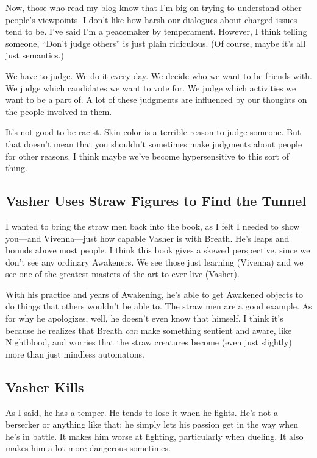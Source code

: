 Now, those who read my blog know that I’m big on trying to understand other people’s viewpoints. I don’t like how harsh our dialogues about charged issues tend to be. I’ve said I’m a peacemaker by temperament. However, I think telling someone, “Don’t judge others” is just plain ridiculous. (Of course, maybe it’s all just semantics.)

We have to judge. We do it every day. We decide who we want to be friends with. We judge which candidates we want to vote for. We judge which activities we want to be a part of. A lot of these judgments are influenced by our thoughts on the people involved in them.

It’s not good to be racist. Skin color is a terrible reason to judge someone. But that doesn’t mean that you shouldn’t sometimes make judgments about people for other reasons. I think maybe we’ve become hypersensitive to this sort of thing.

\subsection*{Vasher Uses Straw Figures to Find the Tunnel}

I wanted to bring the straw men back into the book, as I felt I needed to show you—and Vivenna—just how capable Vasher is with Breath. He’s leaps and bounds above most people. I think this book gives a skewed perspective, since we don’t see any ordinary Awakeners. We see those just learning (Vivenna) and we see one of the greatest masters of the art to ever live (Vasher).

With his practice and years of Awakening, he’s able to get Awakened objects to do things that others wouldn’t be able to. The straw men are a good example. As for why he apologizes, well, he doesn’t even know that himself. I think it’s because he realizes that Breath \textit{can} make something sentient and aware, like Nightblood, and worries that the straw creatures become (even just slightly) more than just mindless automatons.

\subsection*{Vasher Kills}

As I said, he has a temper. He tends to lose it when he fights. He’s not a berserker or anything like that; he simply lets his passion get in the way when he’s in battle. It makes him worse at fighting, particularly when dueling. It also makes him a lot more dangerous sometimes.

